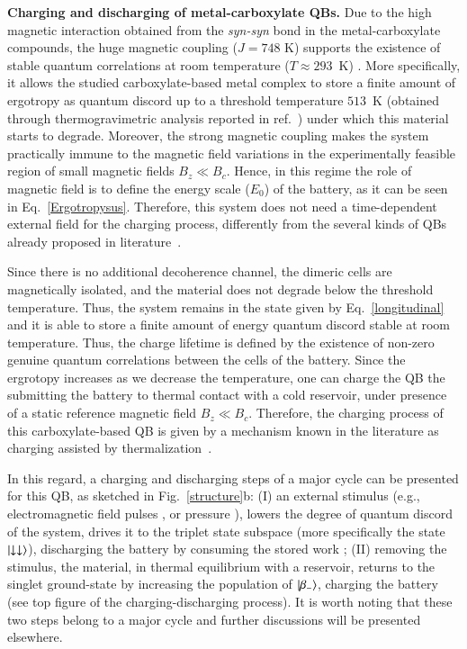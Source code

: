\documentclass[aps,prl,epsfigure,twocolumn,superscriptaddress]{revtex4-1}
\newcommand{\1}{\mathbbm{1}}
\begin{document}
\textbf{Charging and discharging of metal-carboxylate QBs.} Due to the high magnetic interaction obtained from the \textit{syn-syn} bond in the metal-carboxylate compounds, the huge magnetic coupling ($J\!=\!748$ K) supports the existence of stable quantum correlations at room temperature ($T\approx293$~K) \cite{cruz}. More specifically, it allows the studied carboxylate-based metal complex to store a finite amount of ergotropy as quantum discord up to a threshold temperature $513$~K (obtained through thermogravimetric analysis reported in ref.~\cite{cruz}) under which this material starts to degrade. Moreover, the strong magnetic coupling makes the system practically immune to the magnetic field variations in the experimentally feasible region of small magnetic fields $B_z\!\ll\!B_c$. Hence, in this regime the role of magnetic field is to define the energy scale ($E_0$) of the battery, as it can be seen in Eq.~\eqref{Ergotropysus}. Therefore, this system does not need a time-dependent external field for the charging process, differently from the several kinds of QBs already proposed in literature~\cite{PRL2017Binder,PRL_Andolina,Santos:20c,Le:18,Kwon:18,Alexia:20,Kamin:20-2}. 

Since there is no additional decoherence channel, the dimeric cells are magnetically isolated, and the material does not degrade below the threshold temperature. Thus, the system remains in the state given by Eq.~\eqref{longitudinal} and it is able to store a finite amount of energy quantum discord stable at room temperature. Thus, the charge lifetime is defined by the existence of non-zero genuine quantum correlations between the cells of the battery. Since the ergrotopy increases as we decrease the temperature, one can charge the QB the submitting the battery to thermal contact with a cold reservoir, under presence of a static reference magnetic field $B_z\ll B_c$. Therefore, the charging process of this carboxylate-based QB is given by a mechanism known in the literature as charging assisted by thermalization~\cite{Hovhannisyan:20}. 

In this regard, a charging and discharging steps of a major cycle can be presented  for this QB, as sketched in  Fig.~\ref{structure}{\color{blue}b}: (I) an external stimulus (e.g., electromagnetic field pulses \cite{moreno2018molecular,gaita2019molecular}, or pressure \cite{cruz2017influence,cruz2020quantifying}), lowers the degree of quantum discord of the system, drives it to the triplet state subspace (more specifically the state $\ket{\downarrow\downarrow}$),
discharging the battery by consuming the stored work \cite{PhysRevLett.125.180603,Alexia:20,Hovhannisyan:20,PhysRevE.102.042111}; (II) removing the stimulus, the material, in thermal equilibrium with a reservoir, returns to the singlet ground-state by increasing the population of $\ket{\beta_{-}}$, charging the battery (see top figure of the charging-discharging process). It is worth noting that these two steps belong to a major cycle and further discussions will be presented elsewhere.
\end{document}
